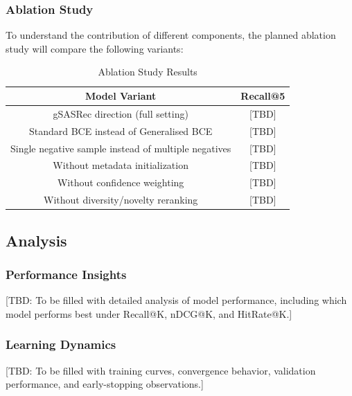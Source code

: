 
\subsubsection{Ablation Study}

To understand the contribution of different components, the planned ablation study will compare the following variants:

\begin{table}[htbp]
    \centering
    \caption{Ablation Study Results}
    \label{tab:ablation}
    \begin{tabular}{|c|c|}
        \hline
        \textbf{Model Variant} & \textbf{Recall@5} \\
        \hline
        gSASRec direction (full setting) & [TBD] \\
        \hline
        Standard BCE instead of Generalised BCE & [TBD] \\
        \hline
        Single negative sample instead of multiple negatives & [TBD] \\
        \hline
        Without metadata initialization & [TBD] \\
        \hline
        Without confidence weighting & [TBD] \\
        \hline
        Without diversity/novelty reranking & [TBD] \\
        \hline
    \end{tabular}
\end{table}

\subsection{Analysis}

\subsubsection{Performance Insights}

[TBD: To be filled with detailed analysis of model performance, including which model performs best under Recall@K, nDCG@K, and HitRate@K.]

\subsubsection{Learning Dynamics}

[TBD: To be filled with training curves, convergence behavior, validation performance, and early-stopping observations.]

